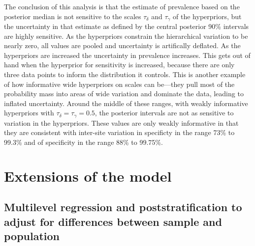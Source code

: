 \documentclass[11pt]{article}
\begin{document}
The conclusion of this analysis is that the estimate of prevalence
based on the posterior median is not sensitive to the scales
$\tau_{\delta}$ and $\tau_{\gamma}$ of the hyperpriors, but the
uncertainty in that estimate as defined by the central posterior 90\%
intervals are highly sensitive. As the hyperpriors constrain the
hierarchical variation to be nearly zero, all values are pooled and
uncertainty is artifically deflated. As the hyperpriors are increased
the uncertainty in prevalence increases. This gets out of hand when
the hyperprior for sensitivity is increased, because there are only
three data points to inform the distribution it controls. This is
another example of how informative wide hyperpriors on scales can
be---they pull most of the probability mass into areas of wide
variation and dominate the data, leading to inflated uncertainty.
Around the middle of these ranges, with weakly informative hyperpriors
with $\tau_{\delta} = \tau_{\gamma} = 0.5$, the posterior intervals
are not as sensitive to variation in the hyperpriors. These values are
only weakly informative in that they are consistent with inter-site
variation in specificty in the range 73\% to 99.3\% and of specificity
in the range 88\% to 99.75\%.

\section{Extensions of the model}

\subsection{Multilevel regression and poststratification to adjust for differences between sample and population}\label{mrp}
\end{document}
